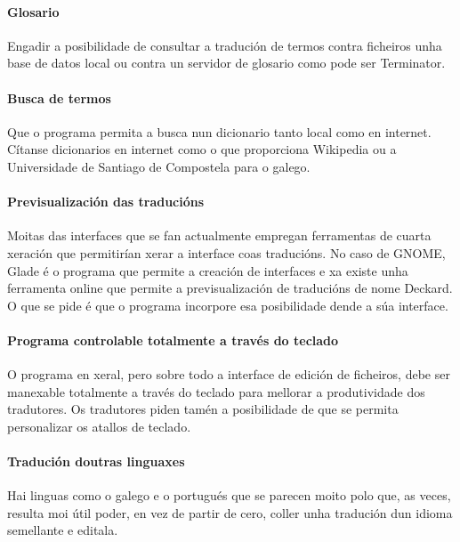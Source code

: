 	\paragraph{Glosario} Engadir a posibilidade de consultar a tradución de termos contra ficheiros unha base de datos local ou contra un servidor de glosario como pode ser Terminator.

	\paragraph{Busca de termos} Que o programa permita a busca nun dicionario tanto local como en internet. Cítanse dicionarios en internet como o que proporciona Wikipedia ou a Universidade de Santiago de Compostela para o galego.

	\paragraph{Previsualización das traducións} Moitas das interfaces que se fan actualmente empregan ferramentas de cuarta xeración que permitirían xerar a interface coas traducións. No caso de GNOME, Glade é o programa que permite a creación de interfaces e xa existe unha ferramenta online que permite a previsualización de traducións de nome Deckard. O que se pide é que o programa incorpore esa posibilidade dende a súa interface.

	\paragraph{Programa controlable totalmente a través do teclado} O programa en xeral, pero sobre todo a interface de edición de ficheiros, debe ser manexable totalmente a través do teclado para mellorar a produtividade dos tradutores. Os tradutores piden tamén a posibilidade de que se permita personalizar os atallos de teclado.

	\paragraph{Tradución doutras linguaxes} Hai linguas como o galego e o portugués que se parecen moito polo que, as veces, resulta moi útil poder, en vez de partir de cero, coller unha tradución dun idioma semellante e editala.

